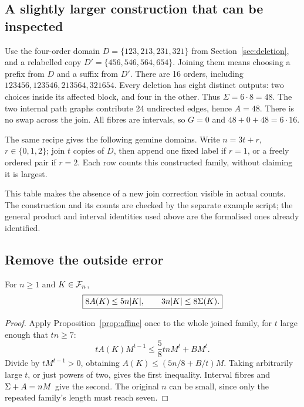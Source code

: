 \subsection{A slightly larger construction that can be inspected}
Use the four-order domain \(D=\{123,213,231,321\}\) from
Section~\ref{sec:deletion}, and a relabelled copy
\(D'=\{456,546,564,654\}\). Joining them means choosing a prefix
from \(D\) and a suffix from \(D'\). There are 16 orders, including
\(123456,123546,213564,321654\). Every deletion has eight distinct
outputs: two choices inside its affected block, and four in the other.
Thus \(\Sigma=6\cdot8=48\). The two internal path graphs contribute
24 undirected edges, hence \(A=48\). There is no swap across the join.
All fibres are intervals, so \(G=0\) and \(48+0+48=6\cdot16\).

The same recipe gives the following genuine domains. Write
\(n=3t+r\), \(r\in\{0,1,2\}\); join \(t\) copies of \(D\), then
append one fixed label if \(r=1\), or a freely ordered pair if \(r=2\).
Each row counts this constructed family, without claiming it is largest.

This table makes the absence of a new join correction visible in
actual counts. The construction and its counts are checked by the
separate example script; the general product and interval identities
used above are the formalised ones already identified.

\subsection{Remove the outside error}

\begin{theorem}\label{thm:density}
For \(n\geq1\) and \(K\in\mathcal F_n\),
\[
 \boxed{8A(K)\leq5n|K|,\qquad3n|K|\leq8\Sigma(K).}
\]
\end{theorem}
\begin{proof}
Apply Proposition~\ref{prop:affine} once to the whole joined family,
for \(t\) large enough that \(tn\geq7\):
\[
 tA(K)M^{t-1}\leq\frac58tnM^t+BM^t.
\]
Divide by \(tM^{t-1}>0\), obtaining
\(A(K)\leq(5n/8+B/t)M\). Taking arbitrarily large \(t\), or just
powers of two, gives the first inequality. Interval fibres and
\(\Sigma+A=nM\) give the second. The original \(n\) can be small,
since only the repeated family's length must reach seven.
\end{proof}
